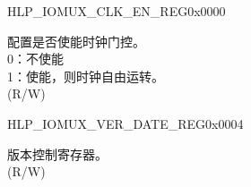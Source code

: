 \begin{register}{H}{LP\_IOMUX\_CLK\_EN\_REG}{0x0000}\label{regdesc:LPIOMUXCLKENREG}
%
%
\regnewline%
\begin{regdesc}\begin{reglist}
\label{fielddesc:LPIOMUXCLKEN}\item [LP\_IOMUX\_CLK\_EN] 配置是否使能时钟门控。\\
0：不使能\\
1：使能，则时钟自由运转。\\
(R/W)
\end{reglist}\end{regdesc}
\end{register}


\begin{register}{H}{LP\_IOMUX\_VER\_DATE\_REG}{0x0004}\label{regdesc:LPIOMUXVERDATEREG}
%
%
\regnewline%
\begin{regdesc}\begin{reglist}
\label{fielddesc:LPIOMUXVERDATE}\item [LP\_IOMUX\_VER\_DATE]  版本控制寄存器。\\
(R/W)
\end{reglist}\end{regdesc}
\end{register}


